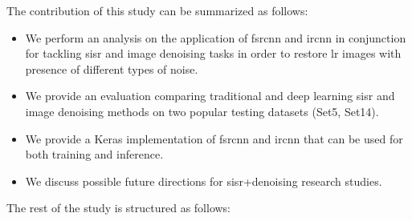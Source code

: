 The contribution of this study can be summarized as follows:
\begin{itemize}
	\item We perform an analysis on the application of  \gls{fsrcnn} and \gls{ircnn} in conjunction for tackling \gls{sisr} and image denoising tasks in order to restore \gls{lr} images with presence of different types of noise.
	\item We provide an evaluation comparing traditional and deep learning \gls{sisr} and image denoising methods on two popular testing datasets (Set5, Set14).
	\item We provide a Keras \cite{KERAS} implementation of \gls{fsrcnn} and \gls{ircnn} that can be used for both training and inference.
	\item We discuss possible future directions for \gls{sisr}+denoising research studies.
\end{itemize}

The rest of the study is structured as follows:
